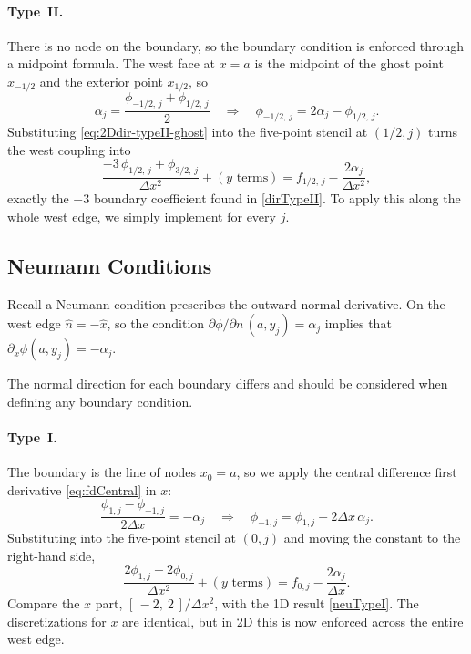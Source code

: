 \paragraph{Type~II.}
There is no node on the boundary, so the boundary condition is enforced through a midpoint formula.
The west face at $x=a$ is the midpoint of the ghost point $x_{-1/2}$ and the
exterior point $x_{1/2}$, so
\begin{equation}
    \alpha_j = \frac{\phi_{-1/2,\,j}+\phi_{1/2,\,j}}{2}
    \quad\Longrightarrow\quad
    \phi_{-1/2,\,j} = 2\alpha_j - \phi_{1/2,\,j}.
    \label{eq:2Ddir-typeII-ghost}
\end{equation}
Substituting \eqref{eq:2Ddir-typeII-ghost} into the five-point stencil at
$(1/2,j)$ turns the west coupling into
\begin{equation}
    \frac{-3\,\phi_{1/2,\,j}+\phi_{3/2,\,j}}{\Delta x^2}
    + (\text{$y$ terms})
    = f_{1/2,\,j}-\frac{2\alpha_j}{\Delta x^2},
    \label{eq:2Ddir-typeII}
\end{equation}
exactly the $-3$ boundary coefficient found in \eqref{dirTypeII}. To apply this along the whole west edge, we simply implement for every $j$.

\subsection{Neumann Conditions}
\label{sec:2Dneumann}

Recall a Neumann condition prescribes the outward normal derivative. On the west edge
$\hat n=-\hat x$, so the condition
$\partial\phi/\partial n\,(a,y_j)= \alpha_j$ implies that
$\partial_x\phi(a,y_j)=-\alpha_j$.

\begin{remark}
The normal direction for each boundary differs and should be considered when defining any boundary condition.
\end{remark}

\paragraph{Type~I.}
The boundary is the line of nodes $x_0=a$, so we apply the central difference first derivative \eqref{eq:fdCentral} in $x$:
\begin{equation}
    \frac{\phi_{1,j}-\phi_{-1,j}}{2\Delta x} = -\alpha_j
    \quad\Longrightarrow\quad
    \phi_{-1,j} = \phi_{1,j} + 2\Delta x\,\alpha_j.
    \label{eq:2Dneu-typeI-ghost}
\end{equation}
Substituting into the five-point stencil at $(0,j)$  and moving the constant to the right-hand side,
\begin{equation}
    \frac{2\phi_{1,j}-2\phi_{0,j}}{\Delta x^2}
    + (\text{$y$ terms})
    = f_{0,j} - \frac{2\alpha_j}{\Delta x}.
    \label{eq:2Dneu-typeI}
\end{equation}
Compare the $x$ part, $[\,-2,\ 2\,]/\Delta x^2$, with the 1D result
\eqref{neuTypeI}. The discretizations for $x$ are identical, but in 2D this is now enforced across the entire west edge.

